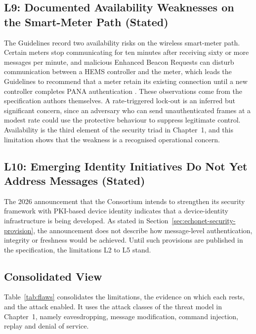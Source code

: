 \subsection{L9: Documented Availability Weaknesses on the Smart-Meter Path (Stated)}

The Guidelines record two availability risks on the wireless smart-meter path. Certain meters stop communicating for ten minutes after receiving sixty or more messages per minute, and malicious Enhanced Beacon Requests can disturb communication between a HEMS controller and the meter, which leads the Guidelines to recommend that a meter retain its existing connection until a new controller completes PANA authentication \cite{ECHONETGuidelines}. These observations come from the specification authors themselves. A rate-triggered lock-out is an inferred but significant concern, since an adversary who can send unauthenticated frames at a modest rate could use the protective behaviour to suppress legitimate control. Availability is the third element of the security triad in Chapter~1, and this limitation shows that the weakness is a recognised operational concern.

\subsection{L10: Emerging Identity Initiatives Do Not Yet Address Messages (Stated)}

The 2026 announcement that the Consortium intends to strengthen its security framework with PKI-based device identity \cite{SEALSQ2026} indicates that a device-identity infrastructure is being developed. As stated in Section~\ref{sec:echonet-security-provision}, the announcement does not describe how message-level authentication, integrity or freshness would be achieved. Until such provisions are published in the specification, the limitations L2 to L5 stand.

\subsection{Consolidated View}

Table~\ref{tab:flaws} consolidates the limitations, the evidence on which each rests, and the attack enabled. It uses the attack classes of the threat model in Chapter~1, namely eavesdropping, message modification, command injection, replay and denial of service.

